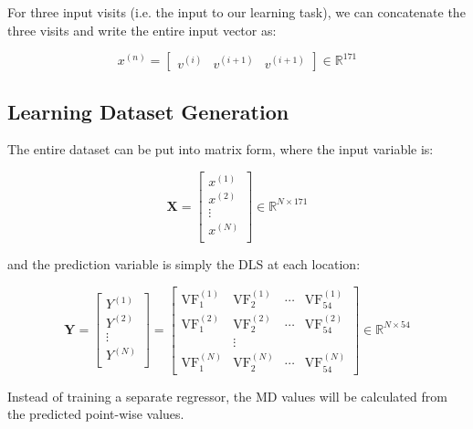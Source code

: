 For three input visits (i.e. the input to our learning task), we can concatenate the three visits and write the entire input vector as: 

\begin{equation}
x^{(n)} = \begin{bmatrix}
v^{(i)} & v^{(i+1)} & v^{(i+1)}
\end{bmatrix}
\in \mathbb{R}^{171}
\end{equation}

\subsection{Learning Dataset Generation} \label{sec:datasetgeneration}

The entire dataset can be put into matrix form, where the input variable is:

\begin{equation}
\mathbf{X} = \begin{bmatrix}
x^{(1)} \\
x^{(2)} \\
\vdots \\
x^{(N)} \\
\end{bmatrix}
\in \mathbb{R}^{N\times 171}
\end{equation}

and the prediction variable is simply the \ac{DLS} at each location:

\begin{equation}
\mathbf{Y} = \begin{bmatrix}
Y^{(1)} \\
Y^{(2)} \\
\vdots \\
Y^{(N)} \\
\end{bmatrix}
= \begin{bmatrix}
\textrm{VF}_1^{(1)} & \textrm{VF}_2^{(1)} & \cdots & \textrm{VF}_{54}^{(1)} \\
\textrm{VF}_1^{(2)} & \textrm{VF}_2^{(2)} & \cdots & \textrm{VF}_{54}^{(2)} \\
& \vdots & & \\
\textrm{VF}_1^{(N)} & \textrm{VF}_2^{(N)} & \cdots & \textrm{VF}_{54}^{(N)}
\end{bmatrix}
\in \mathbb{R}^{N\times 54}
\end{equation}

Instead of training a separate regressor, the \ac{MD} values will be calculated from the predicted point-wise values. 

